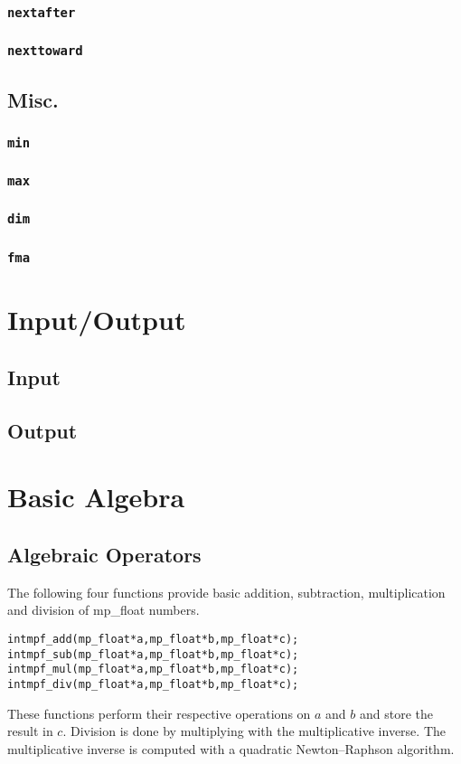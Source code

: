 \documentclass[a4paper]{book}
\theoremstyle{definition}
\theoremstyle{remark}
\begin{document}
\subsection{{\texttt{nextafter}}}
\subsection{{\texttt{nexttoward}}}

\section{Misc.}
\subsection{{\texttt{min}}}
\subsection{{\texttt{max}}}
\subsection{{\texttt{dim}}}
\subsection{{\texttt{fma}}}

\chapter{Input/Output}
\section{Input}
\section{Output}


\chapter{Basic Algebra}
\section{Algebraic Operators}

The following four functions provide basic addition, subtraction, multiplication and division of mp\_float numbers.

    
\begin{alltt}
int  mpf_add(mp_float *a, mp_float *b, mp_float *c);
int  mpf_sub(mp_float *a, mp_float *b, mp_float *c);
int  mpf_mul(mp_float *a, mp_float *b, mp_float *c);
int  mpf_div(mp_float *a, mp_float *b, mp_float *c);
\end{alltt}
These functions perform their respective operations on $a$ and $b$ and store the result in $c$.
Division is done by multiplying with the multiplicative inverse. The multiplicative inverse is computed with a quadratic Newton--Raphson algorithm.
\end{document}
